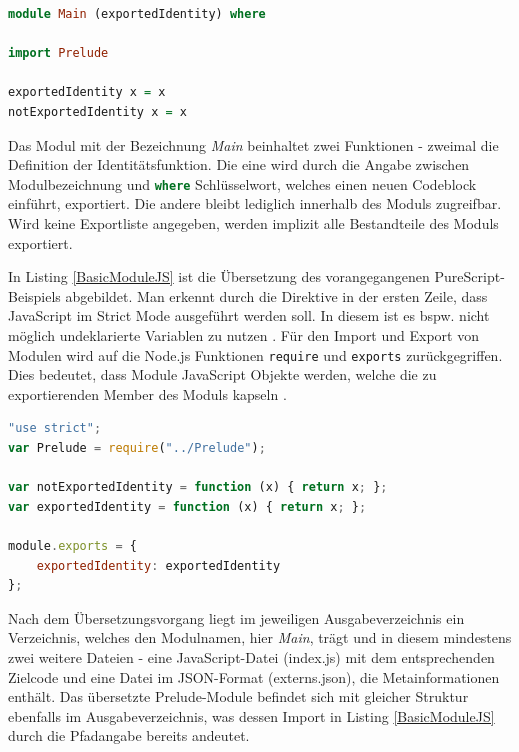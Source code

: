 \documentclass[
12pt,
ngerman,
oneside]
{scrbook} %
\begin{document}
\begin{lstlisting}[language=purescript, style=numbered-and-boxed, caption=Einfache Moduldefinition mit Imports und Exports in PureScript, label=BasicModulePS]
module Main (exportedIdentity) where

import Prelude

exportedIdentity x = x
notExportedIdentity x = x 
\end{lstlisting}

Das Modul mit der Bezeichnung \emph{Main} beinhaltet zwei Funktionen - zweimal die Definition der Identitätsfunktion. Die eine wird durch die Angabe zwischen Modulbezeichnung und \lstinline[language=purescript, columns=fixed]{where} Schlüsselwort, welches einen neuen Codeblock einführt, exportiert. Die andere bleibt lediglich innerhalb des Moduls zugreifbar.
Wird keine Exportliste angegeben, werden implizit alle Bestandteile des Moduls exportiert.

In Listing \ref{BasicModuleJS} ist die Übersetzung des vorangegangenen PureScript-Beispiels abgebildet. Man erkennt durch die Direktive in der ersten Zeile, dass JavaScript im Strict Mode ausgeführt werden soll. In diesem ist es bspw. nicht möglich undeklarierte Variablen zu nutzen \cite{w3schoolsJSStrictMode18}. Für den Import und Export von Modulen wird auf die Node.js Funktionen \lstinline[language=javascript, columns=fixed]{require} und  \lstinline[language=javascript, columns=fixed]{exports} zurückgegriffen. Dies bedeutet, dass Module JavaScript Objekte werden, welche die zu exportierenden Member des Moduls kapseln \cite{NodeJSModules18}.

\begin{lstlisting}[language=javascript, style=numbered-and-boxed, caption= Übersetzung der einfachen Moduldefinition nach JavaScript, label=BasicModuleJS]
"use strict";
var Prelude = require("../Prelude");

var notExportedIdentity = function (x) { return x; };
var exportedIdentity = function (x) { return x; };

module.exports = {
	exportedIdentity: exportedIdentity
};
\end{lstlisting}

 Nach dem Übersetzungsvorgang liegt im jeweiligen Ausgabeverzeichnis ein Verzeichnis, welches den Modulnamen, hier \emph{Main}, trägt und in diesem mindestens zwei weitere Dateien - eine JavaScript-Datei (index.js) mit dem entsprechenden Zielcode und eine Datei im JSON-Format (externs.json), die Metainformationen enthält. Das übersetzte Prelude-Module befindet sich mit gleicher Struktur  ebenfalls im Ausgabeverzeichnis, was dessen Import in Listing \ref{BasicModuleJS} durch die Pfadangabe bereits andeutet.
\end{document}
